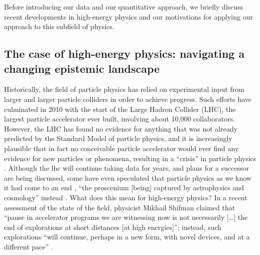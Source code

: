 \documentclass{article}
\begin{document}
Before introducing our data and our quantitative approach, we briefly discuss recent developments in high-energy physics and our motivations for applying our approach to this subfield of physics. 




\subsection{\label{sec:hep}The case of high-energy physics: navigating a changing epistemic landscape}

Historically, the field of particle physics has relied on experimental input from larger and larger particle colliders in order to achieve progress. Such efforts have culminated in 2010 with the start of the Large Hadron Collider (LHC), the largest particle accelerator ever built, involving about 10,000 collaborators. However, the LHC has found no evidence for anything that was not already predicted by the Standard Model of particle physics, and it is increasingly plausible that in fact no conceivable particle accelerator would ever find any evidence for new particles or phenomena, resulting in a ``crisis'' in particle physics \citep{susy_crisis}. Although the \gls{lhc} will continue taking data for years, and plans for a successor are being discussed, some have even speculated that particle physics as we know it had come to an end \citep{Harlander2023,Kosyakov2023}, ``the proscenium
[being] captured by astrophysics and cosmology'' instead \citep{Kosyakov2023}. What does this mean for high-energy physics? In a recent assessment of the state of the field, physicist Mikhail Shifman claimed that ``pause in accelerator programs we are witnessing now is not necessarily [\dots] the end of explorations at short distances [at high energies]''; instead, such explorations ``will continue, perhaps in a new form, with novel devices, and at a different pace'' \citep{Shifman2020}.
\end{document}
